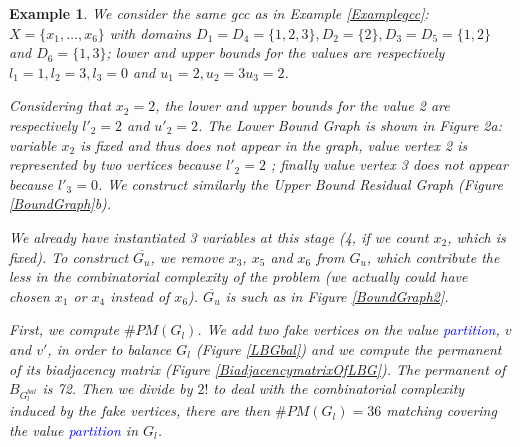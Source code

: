 \documentclass[jair,twoside,11pt,theapa]{article}
\newtheorem{example}[theorem]{Example}
\newcommand{\minor}[1]{\textcolor{blue}{#1}}
\newcommand{\var}[1]{x_{#1}}
\newcommand{\Domain}{D}
\newcommand{\setofVars}[2]{\lbrace \var{#1}, \ldots , \var{#2} \rbrace }
\newcommand{\low}{l}
\newcommand{\adjustedlow}{\low'}
\newcommand{\up}{u}
\newcommand{\adjustedup}{\up'}
\begin{document}
\begin{example}
\label{FirstExample}
	We consider the same gcc as in Example \ref{Examplegcc}: $X = \setofVars{1}{6}$ with domains $\Domain_1=\Domain_4=\lbrace 1,2,3\rbrace, \Domain_2=\lbrace 2 \rbrace, \Domain_3=\Domain_5=\lbrace 1,2 \rbrace$ and $\Domain_6= \lbrace 1,3 \rbrace$; lower and upper bounds for the values are respectively $\low_1=1, \low_2=3, \low_3=0$ and $\up_1=2, \up_2=3 \up_3=2$. 
	
	Considering that $\var{2}=2$, the lower and upper bounds for the value 2 are respectively $\adjustedlow_2=2$ and $\adjustedup_2=2$. The Lower Bound Graph is shown in Figure 2a: variable $\var{2}$ is fixed and thus does not appear in the graph, value vertex 2 is represented by two vertices because $\adjustedlow_2=2$ ; finally value vertex 3 does not appear because $l'_3=0$. We construct similarly the Upper Bound Residual Graph (Figure \ref{BoundGraph}b).

We already have instantiated 3 variables at this stage (4, if we count $x_2$, which is fixed). To construct $\overline{G_u}$, we remove $x_3$, $x_5$ and $x_6$ from $G_u$, which contribute the less in the combinatorial complexity of the problem (we actually could have chosen $x_1$ or $x_4$ instead of $x_6$). $\overline{G_u}$ is such as in Figure \ref{BoundGraph2}.



First, we compute $\#PM(G_l)$. We add two fake vertices on the value \minor{partition}, $v$ and $v'$, in order to balance $G_l$ (Figure \ref{LBGbal}) and we compute the permanent of its biadjacency matrix (Figure \ref{BiadjacencymatrixOfLBG}). The permanent of $B_{G^{bal}_l}$ is 72. Then we divide by $2!$ to deal with the combinatorial complexity induced by the fake vertices, there are then $\#PM(G_l)=36$ matching covering the value \minor{partition} in $G_l$.

\begin{figure*}
\centering

\begin{subfigure}[normal]{0.4\textwidth}
\centering
{}
\end{subfigure}
\end{figure*}
\end{example}
\end{document}
